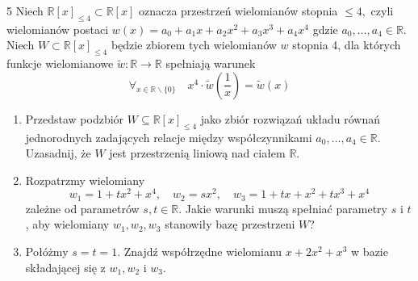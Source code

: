 \documentclass{../note}
\begin{document}
\begin{zadanie}{5}
Niech $\mathbb{R}[x]_{\le 4}\subset\mathbb{R}[x]$ oznacza przestrzeń wielomianów stopnia $\le 4,$ czyli wielomianów postaci $w(x)=a_{0}+a_{1}x+a_{2}x^{2}+a_{3}x^{3}+a_{4}x^{4}$ gdzie $a_{0},\dots,a_{4}\in\mathbb{R}$. Niech $W\subset\mathbb{R}[x]_{\le 4}$ będzie zbiorem tych wielomianów $w$ stopnia 4, dla których funkcje wielomianowe $\tilde{w}:\mathbb{R}\rightarrow\mathbb{R}$ spełniają warunek
\[ \forall_{x\in\mathbb{R}\backslash\{0\}} \quad x^{4}\cdot\tilde{w}\left(\frac{1}{x}\right)=\tilde{w}(x) \]
\begin{enumerate}
    \item[(a)] Przedstaw podzbiór $W\subseteq\mathbb{R}[x]_{\le 4}$ jako zbiór rozwiązań układu równań jednorodnych zadających relacje między współczynnikami $a_{0},\dots,a_{4}\in\mathbb{R}$. Uzasadnij, że $W$ jest przestrzenią liniową nad ciałem $\mathbb{R}$.
    \item[(b)] Rozpatrzmy wielomiany
    \[ w_{1}=1+tx^{2}+x^{4}, \quad w_{2}=sx^{2}, \quad w_{3}=1+tx+x^{2}+tx^{3}+x^{4} \]
    zależne od parametrów $s, t\in\mathbb{R}.$ Jakie warunki muszą spełniać parametry $s$ i $t$, aby wielomiany $w_{1}, w_{2}, w_{3}$ stanowiły bazę przestrzeni $W$?
    \item[(c)] Połóżmy $s=t=1$. Znajdź współrzędne wielomianu $x+2x^{2}+x^{3}$ w bazie składającej się z $w_{1}, w_{2}$ i $w_{3}$.
\end{enumerate}
\end{zadanie}
\end{document}

